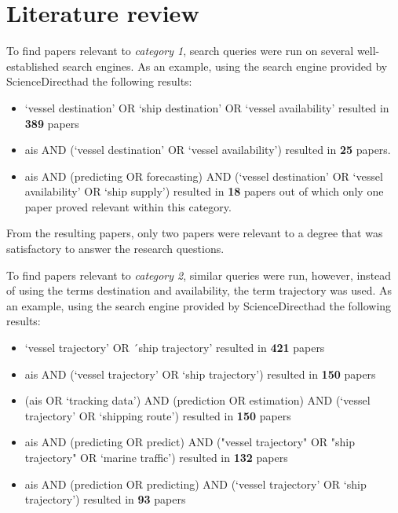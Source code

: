 \section{Literature review}
\label{sec:lit_review}

To find papers relevant to \textit{category 1}, search queries were run on several well-established search engines. As an example, using the search engine provided by ScienceDirect\footnotemark had the following results:

\begin{itemize}
    \item `vessel destination' OR `ship destination' OR `vessel availability' resulted in \textbf{389} papers
    \item ais AND (`vessel destination' OR `vessel availability') resulted in \textbf{25} papers.
    \item ais AND (predicting OR forecasting) AND (`vessel destination' OR `vessel availability' OR `ship supply') resulted in \textbf{18} papers out of which only one paper proved relevant within this category.
\end{itemize}

From the resulting papers, only two papers were relevant to a degree that was satisfactory to answer the research questions.

To find papers relevant to \textit{category 2}, similar queries were run, however, instead of using the terms destination and availability, the term trajectory was used. As an example, using the search engine provided by ScienceDirect\footnotemark[\value{footnote}] had the following results:


\begin{itemize}
    \item `vessel trajectory' OR ´ship trajectory' resulted in \textbf{421} papers
    \item ais AND (`vessel trajectory' OR `ship trajectory') resulted in \textbf{150} papers
    \item (ais OR `tracking data') AND (prediction OR estimation) AND (`vessel trajectory' OR `shipping route') resulted in \textbf{150} papers
    \item ais AND (predicting OR predict) AND ("vessel trajectory" OR "ship trajectory" OR `marine traffic') resulted in \textbf{132} papers
    \item ais AND (prediction OR predicting) AND (`vessel trajectory' OR `ship trajectory') resulted in \textbf{93} papers
\end{itemize}

